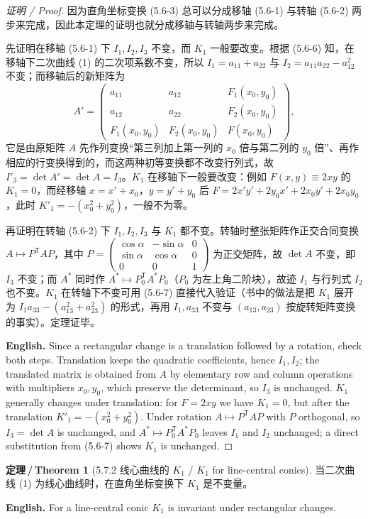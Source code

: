 \documentclass[UTF8,11pt,a4paper]{ctexart}
\newcommand{\EN}[1]{\par\noindent \textbf{English.} #1\par}
\theoremstyle{definition}
\newtheorem*{theorem}{定理\,/\,Theorem}
\begin{document}
\begin{proof}[证明 / Proof]
因为直角坐标变换 (5.6-3) 总可以分成移轴 (5.6-1) 与转轴 (5.6-2) 两步来完成，因此本定理的证明也就分成移轴与转轴两步来完成。

先证明在移轴 (5.6-1) 下 $I_1,I_2,I_3$ 不变，而 $K_1$ 一般要改变。根据 (5.6-6) 知，在移轴下二次曲线 (1) 的二次项系数不变，所以 $I_1=a_{11}+a_{22}$ 与 $I_2=a_{11}a_{22}-a_{12}^2$ 不变；而移轴后的新矩阵为
\[
A'=\begin{pmatrix}a_{11}&a_{12}&F_1(x_0,y_0)\\ a_{12}&a_{22}&F_2(x_0,y_0)\\ F_1(x_0,y_0)&F_2(x_0,y_0)&F(x_0,y_0)\end{pmatrix},
\]
它是由原矩阵 $A$ 先作列变换``第三列加上第一列的 $x_0$ 倍与第二列的 $y_0$ 倍''、再作相应的行变换得到的，而这两种初等变换都不改变行列式，故 $I'_3=\det A'=\det A=I_3$。$K_1$ 在移轴下一般要改变：例如 $F(x,y)\equiv 2xy$ 的 $K_1=0$，而经移轴 $x=x'+x_0$，$y=y'+y_0$ 后 $F=2x'y'+2y_0x'+2x_0y'+2x_0y_0$，此时 $K'_1=-(x_0^2+y_0^2)$，一般不为零。

再证明在转轴 (5.6-2) 下 $I_1,I_2,I_3$ 与 $K_1$ 都不变。转轴时整张矩阵作正交合同变换 $A\mapsto P^{\mathsf T}AP$，其中 $P=\begin{pmatrix}\cos\alpha&-\sin\alpha&0\\ \sin\alpha&\cos\alpha&0\\ 0&0&1\end{pmatrix}$ 为正交矩阵，故 $\det A$ 不变，即 $I_3$ 不变；而 $A^*$ 同时作 $A^*\mapsto P_0^{\mathsf T}A^*P_0$（$P_0$ 为左上角二阶块），故迹 $I_1$ 与行列式 $I_2$ 也不变。$K_1$ 在转轴下不变可用 (5.6-7) 直接代入验证（书中的做法是把 $K_1$ 展开为 $I_1a_{33}-(a_{13}^2+a_{23}^2)$ 的形式，再用 $I_1,a_{33}$ 不变与 $(a_{13},a_{23})$ 按旋转矩阵变换的事实）。定理证毕。
\EN{Since a rectangular change is a translation followed by a rotation, check both steps. Translation keeps the quadratic coefficients, hence $I_1,I_2$; the translated matrix is obtained from $A$ by elementary row and column operations with multipliers $x_0,y_0$, which preserve the determinant, so $I_3$ is unchanged. $K_1$ generally changes under translation: for $F=2xy$ we have $K_1=0$, but after the translation $K'_1=-(x_0^2+y_0^2)$. Under rotation $A\mapsto P^{\mathsf T}AP$ with $P$ orthogonal, so $I_3=\det A$ is unchanged, and $A^*\mapsto P_0^{\mathsf T}A^*P_0$ leaves $I_1$ and $I_2$ unchanged; a direct substitution from (5.6-7) shows $K_1$ is unchanged.}
\end{proof}

\begin{theorem}[5.7.2 线心曲线的 $K_1$ / $K_1$ for line-central conics]\label{thm:k1inv}
当二次曲线 (1) 为线心曲线时，在直角坐标变换下 $K_1$ 是不变量。
\EN{For a line-central conic $K_1$ is invariant under rectangular changes.}
\end{theorem}
\end{document}
